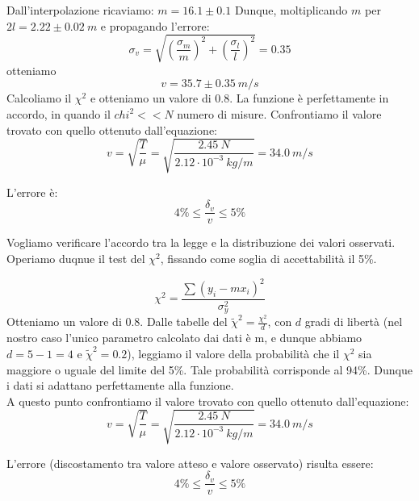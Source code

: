 Dall'interpolazione ricaviamo: $m=16.1\pm0.1$ Dunque, moltiplicando $m$ per $2l=2.22\pm0.02\ m$ e propagando l'errore:
$$\sigma_v=\sqrt{\left(\frac{\sigma_m}{m}\right)^2+\left(\frac{\sigma_l}{l}\right)^2}=0.35$$
otteniamo $$v=35.7\pm0.35\ m/s$$ 
Calcoliamo il  $\chi^2$ e otteniamo un valore di $0.8$. La funzione è perfettamente in accordo, in quando il $chi^2 << N$ numero di misure. 
Confrontiamo il valore trovato con quello ottenuto dall'equazione:
$$v=\sqrt{\frac{T}{\mu}}=\sqrt{\frac{2.45\ N}{2.12 \cdot10^{-3}\ kg/m}}=34.0\ m/s$$

L'errore è:
$$4\% \leq \frac{\delta_v}{v} \leq 5\% $$

Vogliamo verificare l'accordo tra la legge e la distribuzione dei valori osservati. Operiamo duqnue il test del $\chi^2$, fissando come soglia di accettabilità il 5\%.

\begin{equation}
\chi^2=\frac{\displaystyle\sum{(y_i-mx_i)^2}}{\sigma_y^2}
\end{equation} 
Otteniamo un valore di $0.8$. Dalle tabelle del $\tilde{\chi}^2=\frac{\chi^2}{d}$, con $d$ gradi di libertà (nel nostro caso l'unico parametro calcolato dai dati è m, e dunque abbiamo $d=5-1=4$ e $\tilde{\chi}^2=0.2$), leggiamo il valore della probabilità che il $\chi^2$ sia maggiore o uguale del limite del 5\%. Tale probabilità corrisponde al 94\%. Dunque i dati si adattano perfettamente alla funzione.  \\

A questo punto confrontiamo il valore trovato con quello ottenuto dall'equazione:
$$v=\sqrt{\frac{T}{\mu}}=\sqrt{\frac{2.45\ N}{2.12 \cdot10^{-3}\ kg/m}}=34.0\ m/s$$

L'errore (discostamento tra valore atteso e valore osservato) risulta essere:
$$4\% \leq \frac{\delta_v}{v} \leq 5\% $$


